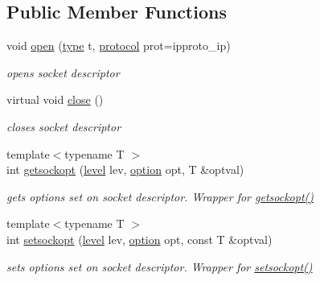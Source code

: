 \subsection*{Public Member Functions}
\begin{CompactItemize}
\item 
void \hyperlink{classsocketpp_1_1BaseSocket_2060dc1b648f83f8bf5ae3d9ecfcd619}{open} (\hyperlink{namespacesocketpp_635f4c3b3f85aba331587404d59ae52d}{type} t, \hyperlink{namespacesocketpp_2969678def1c6c8cb4102802ca82e2cf}{protocol} prot=ipproto\_\-ip)
\begin{CompactList}\small\item\em opens socket descriptor \item\end{CompactList}\item 
virtual void \hyperlink{classsocketpp_1_1BaseSocket_f067195056bb6b5a65c4bc1d2ac7da72}{close} ()
\begin{CompactList}\small\item\em closes socket descriptor \item\end{CompactList}\item 
{\footnotesize template$<$typename T $>$ }\\int \hyperlink{classsocketpp_1_1BaseSocket_c845c3a037f0f400fd50dfb58706b6e4}{getsockopt} (\hyperlink{namespacesocketpp_4dbb83d08769b55fc6e283b73ae11bb5}{level} lev, \hyperlink{namespacesocketpp_ea335944de1f6b81489c90507884cfc4}{option} opt, T \&optval)
\begin{CompactList}\small\item\em gets options set on socket descriptor. Wrapper for \hyperlink{classsocketpp_1_1BaseSocket_c845c3a037f0f400fd50dfb58706b6e4}{getsockopt()} \item\end{CompactList}\item 
{\footnotesize template$<$typename T $>$ }\\int \hyperlink{classsocketpp_1_1BaseSocket_3f1f168e4953c046bb1159941da2fa30}{setsockopt} (\hyperlink{namespacesocketpp_4dbb83d08769b55fc6e283b73ae11bb5}{level} lev, \hyperlink{namespacesocketpp_ea335944de1f6b81489c90507884cfc4}{option} opt, const T \&optval)
\begin{CompactList}\small\item\em sets options set on socket descriptor. Wrapper for \hyperlink{classsocketpp_1_1BaseSocket_3f1f168e4953c046bb1159941da2fa30}{setsockopt()} \item\end{CompactList}\item 

\end{CompactItemize}
